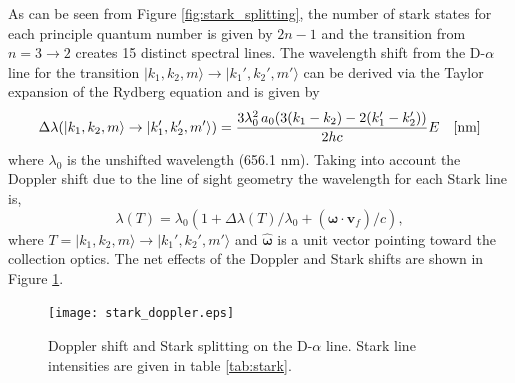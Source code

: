 As can be seen from Figure \ref{fig:stark_splitting}, the number of stark states for each principle quantum number is given by $2n-1$ and the transition from $n=3 \rightarrow 2$ creates 15 distinct spectral lines. The wavelength shift from the D-$\alpha$ line for the transition $|k_1,k_2,m\rangle \rightarrow |k_1',k_2',m'\rangle$ can be derived via the Taylor expansion of the Rydberg equation and is given by
\begin{equation}\label{eq:stark_lambda}
    \Delta \lambda(|k_1,k_2,m\rangle \rightarrow |k_1',k_2',m'\rangle) = \frac{3 \lambda_{0}^2\,a_0 (3(k_1-k_2) - 2(k_1' - k_2'))}{2hc} E \quad \rm{[nm]}
\end{equation}
where $\lambda_0$ is the unshifted wavelength (656.1 nm).
Taking into account the Doppler shift due to the line of sight geometry the wavelength for each Stark line is,
\begin{equation}\label{eq:wavelengths}
    \lambda(T) = \lambda_0 (1 + \Delta \lambda(T)/\lambda_0 + (\boldsymbol{\hat{\omega}} \cdot \mathbf{v}_f)/c),
\end{equation}
where $T =|k_1,k_2,m\rangle \rightarrow |k_1',k_2',m'\rangle$ and $\boldsymbol{\hat{\omega}}$ is a unit vector pointing toward the collection optics. The net effects of the Doppler and Stark shifts are shown in Figure \ref{fig:stark_doppler}.
\begin{figure}[ht]
    \centering
    \texttt{[image: stark\_doppler.eps]}
    \caption{Doppler shift and Stark splitting on the D-$\alpha$ line. Stark line intensities are given in table \ref{tab:stark}.}
    \label{fig:stark_doppler}
\end{figure}

